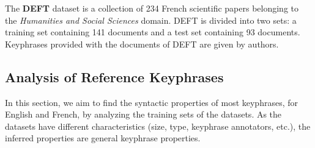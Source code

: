     The \textbf{DEFT} dataset \cite{Paroubek2012deft} is a collection of 234
    French scientific papers belonging to the \textit{Humanities and Social
    Sciences} domain. DEFT is divided into two sets: a training set containing
    141 documents and a test set containing 93 documents. Keyphrases provided
    with the documents of DEFT are given by authors.

  \subsection{Analysis of Reference Keyphrases}
  \label{subsec:keyphrase_analysis}
    In this section, we aim to find the syntactic properties of most keyphrases,
    for English and French, by analyzing the training sets of the datasets. As
    the datasets have different characteristics (size, type, keyphrase
    annotators, etc.), the inferred properties are general keyphrase properties.

